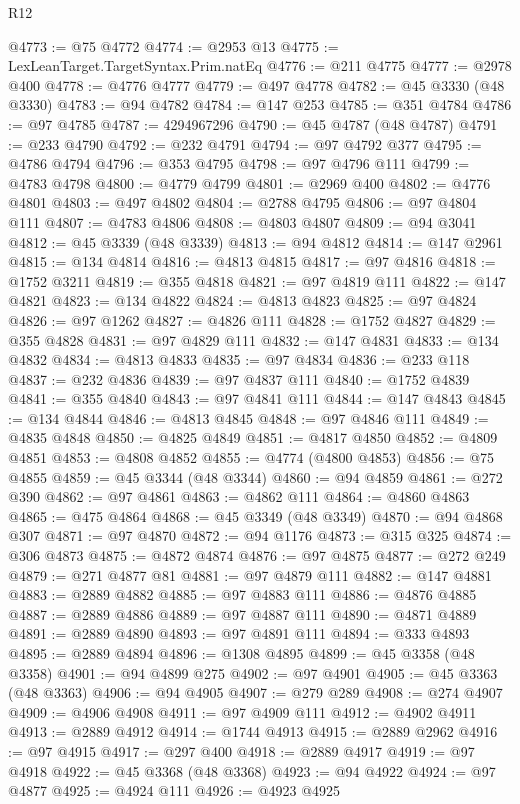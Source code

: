 \begin{lexlean}{R12}
\begin{coremodule}
@4773 := @75 @4772
@4774 := @2953 @13
@4775 := LexLeanTarget.TargetSyntax.Prim.natEq
@4776 := @211 @4775
@4777 := @2978 @400
@4778 := @4776 @4777
@4779 := @497 @4778
@4782 := @45 @3330 (@48 @3330)
@4783 := @94 @4782
@4784 := @147 @253
@4785 := @351 @4784
@4786 := @97 @4785
@4787 := 4294967296
@4790 := @45 @4787 (@48 @4787)
@4791 := @233 @4790
@4792 := @232 @4791
@4794 := @97 @4792 @377
@4795 := @4786 @4794
@4796 := @353 @4795
@4798 := @97 @4796 @111
@4799 := @4783 @4798
@4800 := @4779 @4799
@4801 := @2969 @400
@4802 := @4776 @4801
@4803 := @497 @4802
@4804 := @2788 @4795
@4806 := @97 @4804 @111
@4807 := @4783 @4806
@4808 := @4803 @4807
@4809 := @94 @3041
@4812 := @45 @3339 (@48 @3339)
@4813 := @94 @4812
@4814 := @147 @2961
@4815 := @134 @4814
@4816 := @4813 @4815
@4817 := @97 @4816
@4818 := @1752 @3211
@4819 := @355 @4818
@4821 := @97 @4819 @111
@4822 := @147 @4821
@4823 := @134 @4822
@4824 := @4813 @4823
@4825 := @97 @4824
@4826 := @97 @1262
@4827 := @4826 @111
@4828 := @1752 @4827
@4829 := @355 @4828
@4831 := @97 @4829 @111
@4832 := @147 @4831
@4833 := @134 @4832
@4834 := @4813 @4833
@4835 := @97 @4834
@4836 := @233 @118
@4837 := @232 @4836
@4839 := @97 @4837 @111
@4840 := @1752 @4839
@4841 := @355 @4840
@4843 := @97 @4841 @111
@4844 := @147 @4843
@4845 := @134 @4844
@4846 := @4813 @4845
@4848 := @97 @4846 @111
@4849 := @4835 @4848
@4850 := @4825 @4849
@4851 := @4817 @4850
@4852 := @4809 @4851
@4853 := @4808 @4852
@4855 := @4774 (@4800 @4853)
@4856 := @75 @4855
@4859 := @45 @3344 (@48 @3344)
@4860 := @94 @4859
@4861 := @272 @390
@4862 := @97 @4861
@4863 := @4862 @111
@4864 := @4860 @4863
@4865 := @475 @4864
@4868 := @45 @3349 (@48 @3349)
@4870 := @94 @4868 @307
@4871 := @97 @4870
@4872 := @94 @1176
@4873 := @315 @325
@4874 := @306 @4873
@4875 := @4872 @4874
@4876 := @97 @4875
@4877 := @272 @249
@4879 := @271 @4877 @81
@4881 := @97 @4879 @111
@4882 := @147 @4881
@4883 := @2889 @4882
@4885 := @97 @4883 @111
@4886 := @4876 @4885
@4887 := @2889 @4886
@4889 := @97 @4887 @111
@4890 := @4871 @4889
@4891 := @2889 @4890
@4893 := @97 @4891 @111
@4894 := @333 @4893
@4895 := @2889 @4894
@4896 := @1308 @4895
@4899 := @45 @3358 (@48 @3358)
@4901 := @94 @4899 @275
@4902 := @97 @4901
@4905 := @45 @3363 (@48 @3363)
@4906 := @94 @4905
@4907 := @279 @289
@4908 := @274 @4907
@4909 := @4906 @4908
@4911 := @97 @4909 @111
@4912 := @4902 @4911
@4913 := @2889 @4912
@4914 := @1744 @4913
@4915 := @2889 @2962
@4916 := @97 @4915
@4917 := @297 @400
@4918 := @2889 @4917
@4919 := @97 @4918
@4922 := @45 @3368 (@48 @3368)
@4923 := @94 @4922
@4924 := @97 @4877
@4925 := @4924 @111
@4926 := @4923 @4925

\end{coremodule}
\end{lexlean}
